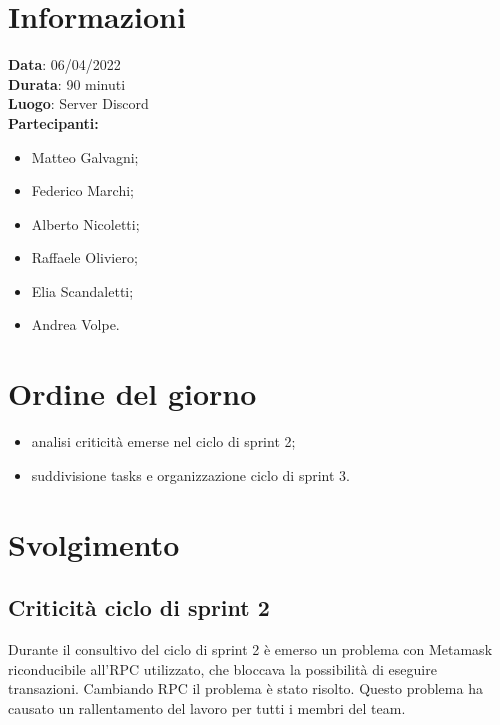 \documentclass[a4paper, 12pt]{article}
\begin{document}
\makefrontpage

\section{Informazioni}
\textbf{Data}: 06/04/2022\\
\textbf{Durata}: 90 minuti\\
\textbf{Luogo}: Server Discord\\

\textbf{Partecipanti:}
\begin{itemize}
	\item Matteo Galvagni;
	\item Federico Marchi;
	\item Alberto Nicoletti;
	\item Raffaele Oliviero;
	\item Elia Scandaletti;
	\item Andrea Volpe.
\end{itemize}


\section{Ordine del giorno}
\begin{itemize}
	\item analisi criticità emerse nel ciclo di sprint 2;
	\item suddivisione tasks e organizzazione ciclo di sprint 3.
\end{itemize}

\section{Svolgimento}

\subsection{Criticità ciclo di sprint 2}
Durante il consultivo del ciclo di sprint 2 è emerso un problema con Metamask riconducibile all'RPC utilizzato, 
che bloccava la possibilità di eseguire transazioni. 
Cambiando RPC il problema è stato risolto. Questo problema ha causato un rallentamento del lavoro per tutti i membri del team.
\end{document}

